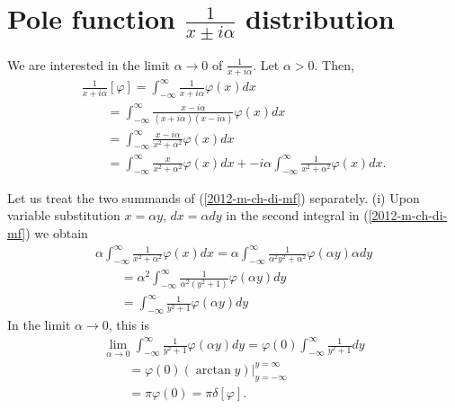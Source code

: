 \section{Pole function $\frac{1}{x\pm i\alpha}$ distribution}

We are interested in the limit $\alpha  \rightarrow 0$ of $\frac{1}{x+i\alpha}$.
Let  $\alpha >0$. Then,
\begin{equation}
\begin{split}
\frac{1}{x+i\alpha} \left[ \varphi \right]
=
\int_{-\infty}^\infty  \frac{1}{x+i\alpha}  \varphi(x) dx
\\
\qquad
=
\int_{-\infty}^\infty   \frac{x-i\alpha}{ (x+i\alpha)(x-i\alpha) }   \varphi(x) dx
\\
\qquad
=
\int_{-\infty}^\infty   \frac{x-i\alpha}{x^2+ \alpha^2}   \varphi(x) dx
\\
\qquad
=
\int_{-\infty}^\infty   \frac{x}{x^2+ \alpha^2}   \varphi(x) dx
+
-i\alpha \int_{-\infty}^\infty   \frac{1}{x^2+ \alpha^2}   \varphi(x) dx
.
\end{split}
\label{2012-m-ch-di-mf}
\end{equation}

Let us treat the two summands of (\ref{2012-m-ch-di-mf}) separately.
(i) Upon variable substitution  $x = \alpha y$, $dx =\alpha dy$ in the second integral in (\ref{2012-m-ch-di-mf}) we obtain
\begin{equation}
\begin{split}
\alpha \int_{-\infty}^\infty   \frac{1}{x^2+ \alpha^2}   \varphi(x) dx
=
\alpha \int_{-\infty}^\infty   \frac{1}{\alpha^2y^2+ \alpha^2}   \varphi(\alpha y) \alpha dy
\\
\qquad
=
\alpha^2 \int_{-\infty}^\infty   \frac{1}{\alpha^2(y^2+ 1)}   \varphi(\alpha y)   dy
\\
\qquad
=
  \int_{-\infty}^\infty   \frac{1}{  y^2+ 1 }   \varphi(\alpha y)   dy
\end{split}
\end{equation}
In the limit $\alpha  \rightarrow 0$, this is
\begin{equation}
\begin{split}
\lim_{\alpha  \rightarrow 0} \int_{-\infty}^\infty   \frac{1}{  y^2+ 1 }   \varphi(\alpha y)   dy
=
\varphi(0) \int_{-\infty}^\infty   \frac{1}{  y^2+ 1 }       dy
\\
\qquad =
\varphi(0) \left. \left( \arctan y \right) \right|_{y=-\infty}^{y=\infty}
\\
\qquad =
\pi \varphi(0) =
\pi \delta [\varphi ]
.
\end{split}
\end{equation}

